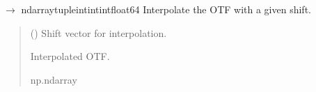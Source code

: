 \documentclass[letterpaper,10pt,english]{sphinxmanual}
\begin{document}
\begin{fulllineitems}
\begin{fulllineitems}
\label{\detokenize{source/OpticalSystems:OpticalSystems.OpticalSystem2D.interpolate_otf}}
\pysigstartsignatures
\pysiglinewithargsret
{}
{}
{{ $\rightarrow$ ndarray\DUrole{p}{{[}}tuple\DUrole{p}{{[}}intintint\DUrole{p}{{]}}float64\DUrole{p}{{]}}}}
\pysigstopsignatures
\sphinxAtStartPar
Interpolate the OTF with a given shift.
\begin{quote}\begin{description}
\sphinxAtStartPar
{} () \textendash{} Shift vector for interpolation.

\sphinxAtStartPar
Interpolated OTF.

\sphinxAtStartPar
np.ndarray

\end{description}\end{quote}

\end{fulllineitems}


\begin{fulllineitems}
\label{\detokenize{source/OpticalSystems:OpticalSystems.OpticalSystem2D.psf_coordinates}}
\pysigstartsignatures
\pysigline
{}
\pysigstopsignatures
\end{fulllineitems}


\end{fulllineitems}

\end{document}
